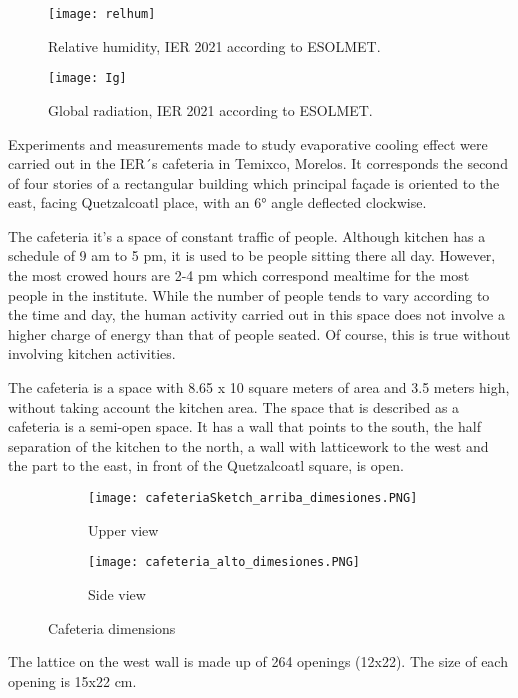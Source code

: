 \begin{figure}
 \centering
 \texttt{[image: relhum]}
 \caption{	
 Relative humidity, IER 2021 according to ESOLMET.
 \label{fig:rh}
 }
\end{figure}


\begin{figure}
 \centering
 \texttt{[image: Ig]}
 \caption{	
 Global radiation, IER 2021 according to ESOLMET.
 \label{fig:Ig}
 }
\end{figure}

Experiments and measurements made to study evaporative cooling effect were carried out in the IER´s cafeteria in Temixco, Morelos. It corresponds the second of four stories of a rectangular building which principal façade is oriented to the east, facing Quetzalcoatl place, with an 6° angle deflected clockwise. 


The cafeteria it’s a space of constant traffic of people. Although kitchen has a schedule of 9 am to 5 pm, it is used to be people sitting there all day. However, the most crowed hours are 2-4 pm which correspond mealtime for the most people in the institute. While the number of people tends to vary according to the time and day, the human activity carried out in this space does not involve a higher charge of energy than that of people seated. Of course, this is true without involving kitchen activities.

The cafeteria is a space with 8.65 x 10 square meters of area and 3.5 meters high, without taking account the kitchen area.  The space that is described as a cafeteria is a semi-open space. It has a wall that points to the south, the half separation of the kitchen to the north, a wall with latticework to the west and the part to the east, in front of the Quetzalcoatl square, is open.

\begin{figure}
\centering
\begin{subfigure}[b]{0.45\linewidth}
\texttt{[image: cafeteriaSketch\_arriba\_dimesiones.PNG]}
\caption{Upper view}
\label{fig:Upper view}
\end{subfigure}
\begin{subfigure}[b]{0.45\linewidth}
\texttt{[image: cafeteria\_alto\_dimesiones.PNG]}
\caption{Side view}
\label{fig:Side view}
\end{subfigure}
\caption{Cafeteria dimensions}
\label{fig:Cafeteria dimensions}
\end{figure}


The lattice on the west wall is made up of 264 openings (12x22). The size of each opening is 15x22 cm.

